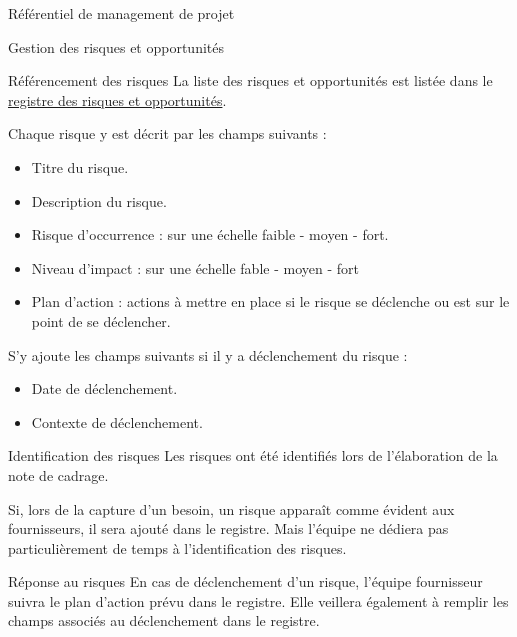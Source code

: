 \documentclass[]{article}
\begin{document}
{\begin{section}{\label{sec:Référentiel de management de projet}Référentiel de management de projet}
     \begin{subsection}{\label{sec:Gestion des risques et opportunités}Gestion des risques et opportunités}
         \begin{subsubsection}{\label{sec:Référencement des risques}Référencement des risques}
             La liste des risques et opportunités est listée dans le \href{documents/Registre_des_risques.pdf}{registre des risques et opportunités}.

             Chaque risque y est décrit par les champs suivants :
             \begin{itemize}
                 \item Titre du risque.
                 \item Description du risque.
                 \item Risque d’occurrence : sur une échelle faible - moyen - fort.
                 \item Niveau d'impact : sur une échelle fable - moyen - fort
                 \item Plan d'action : actions à mettre en place si le risque se déclenche ou est sur le point de se déclencher.
             \end{itemize}

             S'y ajoute les champs suivants si il y a déclenchement du risque :
             \begin{itemize}
                 \item Date de déclenchement.
                 \item Contexte de déclenchement.
             \end{itemize}
         \end{subsubsection}

         \begin{subsubsection}{\label{sec:Identification des risques}Identification des risques}
             Les risques ont été identifiés lors de l'élaboration de la note de cadrage.

             Si, lors de la capture d'un besoin, un risque apparaît comme évident aux fournisseurs, il sera ajouté dans le registre. Mais l'équipe ne dédiera pas particulièrement de temps à l'identification des risques.
         \end{subsubsection}

         \begin{subsubsection}{\label{sec:Réponse au risques}Réponse au risques}
             En cas de déclenchement d'un risque, l'équipe fournisseur suivra le plan d'action prévu dans le registre. Elle veillera également à remplir les champs associés au déclenchement dans le registre.


\end{subsubsection}
\end{subsection}
\end{section}}
\end{document}
